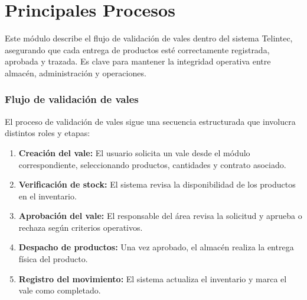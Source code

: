 \chapter{Principales Procesos}

Este módulo describe el flujo de validación de vales dentro del sistema Telintec, asegurando que cada entrega de productos esté correctamente registrada, aprobada y trazada. Es clave para mantener la integridad operativa entre almacén, administración y operaciones.

\subsection{Flujo de validación de vales}

El proceso de validación de vales sigue una secuencia estructurada que involucra distintos roles y etapas:

\begin{enumerate}
    \item \textbf{Creación del vale:} El usuario solicita un vale desde el módulo correspondiente, seleccionando productos, cantidades y contrato asociado.
    \item \textbf{Verificación de stock:} El sistema revisa la disponibilidad de los productos en el inventario.
    \item \textbf{Aprobación del vale:} El responsable del área revisa la solicitud y aprueba o rechaza según criterios operativos.
    \item \textbf{Despacho de productos:} Una vez aprobado, el almacén realiza la entrega física del producto.
    \item \textbf{Registro del movimiento:} El sistema actualiza el inventario y marca el vale como completado.
\end{enumerate}

